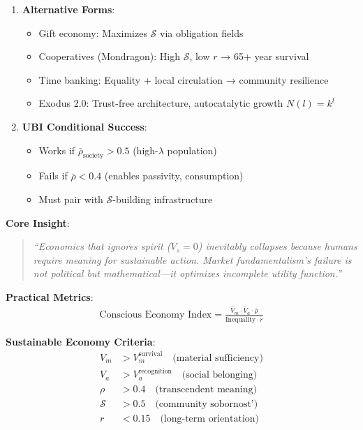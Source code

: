 \documentclass[11pt,a4paper]{article}
\theoremstyle{definition}
\theoremstyle{remark}
\begin{document}
\begin{small}
\begin{enumerate}
\begin{mdframed}[backgroundcolor=green!10,linewidth=2pt,linecolor=green!70!black]
\begin{enumerate}[nosep]
    \item \textbf{Alternative Forms}:
        \begin{itemize}[nosep]
            \item Gift economy: Maximizes \(\mathcal{S}\) via obligation fields
            \item Cooperatives (Mondragon): High \(\mathcal{S}\), low \(r\) → 65+ year survival
            \item Time banking: Equality + local circulation → community resilience
            \item Exodus 2.0: Trust-free architecture, autocatalytic growth \(N(l) = k^l\)
        \end{itemize}
    
\item \textbf{UBI Conditional Success}:
        \begin{itemize}[nosep]
            \item Works if \(\bar{\rho}_{\text{society}} > 0.5\) (high-\(\lambda\) population)
            \item Fails if \(\bar{\rho} < 0.4\) (enables passivity, consumption)
            \item Must pair with \(\mathcal{S}\)-building infrastructure
        \end{itemize}
\end{enumerate}

\textbf{Core Insight}:
\begin{quote}
\textit{``Economics that ignores spirit (\(V_s = 0\)) inevitably collapses because humans require meaning for sustainable action. Market fundamentalism's failure is not political but mathematical—it optimizes incomplete utility function.''}
\end{quote}

\textbf{Practical Metrics}:
\begin{align}
\text{Conscious Economy Index} = \frac{\bar{V}_m \cdot \bar{V}_a \cdot \bar{\rho}}{\text{Inequality} \cdot r}
\end{align}

\textbf{Sustainable Economy Criteria}:
\begin{align}
V_m &> V_m^{\text{survival}} \quad \text{(material sufficiency)} \\
V_a &> V_a^{\text{recognition}} \quad \text{(social belonging)} \\
\rho &> 0.4 \quad \text{(transcendent meaning)} \\
\mathcal{S} &> 0.5 \quad \text{(community sobornost')} \\
r &< 0.15 \quad \text{(long-term orientation)}
\end{align}


\end{mdframed}
\end{enumerate}
\end{small}
\end{document}
